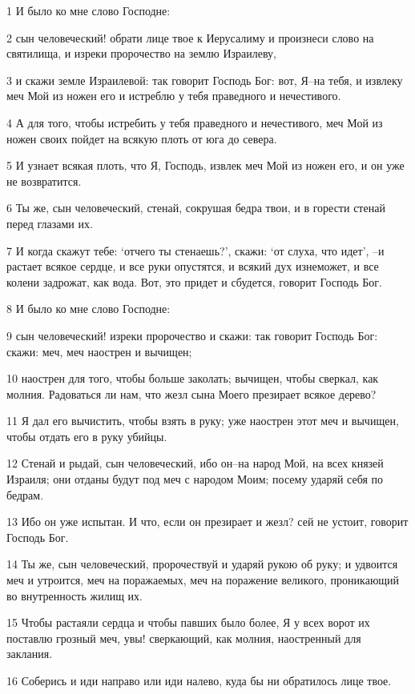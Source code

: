 \par 1 И было ко мне слово Господне:
\par 2 сын человеческий! обрати лице твое к Иерусалиму и произнеси слово на святилища, и изреки пророчество на землю Израилеву,
\par 3 и скажи земле Израилевой: так говорит Господь Бог: вот, Я--на тебя, и извлеку меч Мой из ножен его и истреблю у тебя праведного и нечестивого.
\par 4 А для того, чтобы истребить у тебя праведного и нечестивого, меч Мой из ножен своих пойдет на всякую плоть от юга до севера.
\par 5 И узнает всякая плоть, что Я, Господь, извлек меч Мой из ножен его, и он уже не возвратится.
\par 6 Ты же, сын человеческий, стенай, сокрушая бедра твои, и в горести стенай перед глазами их.
\par 7 И когда скажут тебе: `отчего ты стенаешь?', скажи: `от слуха, что идет', --и растает всякое сердце, и все руки опустятся, и всякий дух изнеможет, и все колени задрожат, как вода. Вот, это придет и сбудется, говорит Господь Бог.
\par 8 И было ко мне слово Господне:
\par 9 сын человеческий! изреки пророчество и скажи: так говорит Господь Бог: скажи: меч, меч наострен и вычищен;
\par 10 наострен для того, чтобы больше заколать; вычищен, чтобы сверкал, как молния. Радоваться ли нам, что жезл сына Моего презирает всякое дерево?
\par 11 Я дал его вычистить, чтобы взять в руку; уже наострен этот меч и вычищен, чтобы отдать его в руку убийцы.
\par 12 Стенай и рыдай, сын человеческий, ибо он--на народ Мой, на всех князей Израиля; они отданы будут под меч с народом Моим; посему ударяй себя по бедрам.
\par 13 Ибо он уже испытан. И что, если он презирает и жезл? сей не устоит, говорит Господь Бог.
\par 14 Ты же, сын человеческий, пророчествуй и ударяй рукою об руку; и удвоится меч и утроится, меч на поражаемых, меч на поражение великого, проникающий во внутренность жилищ их.
\par 15 Чтобы растаяли сердца и чтобы павших было более, Я у всех ворот их поставлю грозный меч, увы! сверкающий, как молния, наостренный для заклания.
\par 16 Соберись и иди направо или иди налево, куда бы ни обратилось лице твое.
